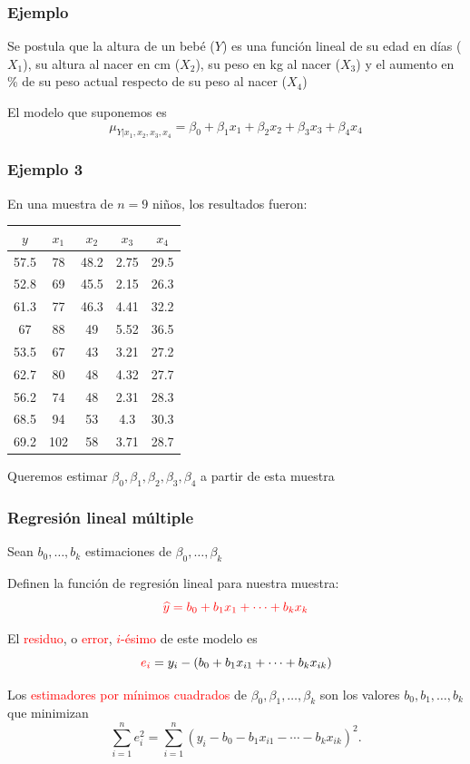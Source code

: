 \documentclass[12pt,t]{beamer}
\newcommand{\red}[1]{\textcolor{red}{#1}}
\renewcommand{\emph}[1]{{\color{red}#1}}
\theoremstyle{plain}
\theoremstyle{definition}
\begin{document}
\begin{frame}
\frametitle{Ejemplo}

Se postula que la altura de un bebé ($Y$) es una función lineal de su edad en días ($X_1$), su altura al nacer en
cm ($X_2$), su peso en kg al nacer ($X_3$) y el aumento en \% de su peso actual respecto de su peso al nacer ($X_4$)
\medskip

El modelo que suponemos es
$$
\mu_{Y|x_1,x_2,x_3,x_4}=\beta_0+\beta_1x_1+\beta_2x_2+\beta_3x_3+\beta_4x_4
$$

\end{frame}

\begin{frame}
\frametitle{Ejemplo 3}
En una muestra de $n=9$
niños, los resultados fueron:

\begin{center}
\begin{tabular}{|c|c|c|c|c|}\hline
$y$ & $x_1$ & $x_2$ & $x_3$ & $x_4$\\\hline
57.5&78&48.2&2.75&29.5\\ 52.8&69&45.5&2.15&26.3\\
61.3&77&46.3&4.41&32.2\\ 67&88&49&5.52&36.5\\ 53.5&67&43&3.21&27.2\\
62.7&80&48&4.32&27.7\\ 56.2&74&48&2.31&28.3\\ 68.5&94&53&4.3&30.3\\
69.2&102&58&3.71&28.7
\\\hline
\end{tabular}\end{center}

Queremos estimar $\beta_0,\beta_1,\beta_2,\beta_3,\beta_4$ a partir de esta muestra

\end{frame}






\begin{frame}
\frametitle{Regresión lineal múltiple}

Sean $b_0,\ldots,b_k$ estimaciones de $\beta_0,\ldots,\beta_k$
\medskip

Definen la \emph{función de regresión lineal} para nuestra muestra:
$$
\red{\widehat{y}=b_0+b_1 x_1+\cdots +b_kx_k}
$$

El \red{residuo}, o \red{error}, \red{$i$-ésimo} de este modelo es
$$
\red{e_i}=y_i-(b_0+b_1 x_{i1}+\cdots +b_kx_{ik})
$$

Los \red{estimadores por mínimos cuadrados} de $\beta_0,\beta_1,\ldots, \beta_k$ son los
valores $b_0,b_1,\ldots, b_k$ que minimizan
$$
\sum\limits_{i=1}^n e^2_i=
\sum\limits_{i=1}^n (y_i-b_0-b_1 x_{i 1}-\cdots -b_{k} x_{ik})^2.
$$
\end{frame}
\end{document}
